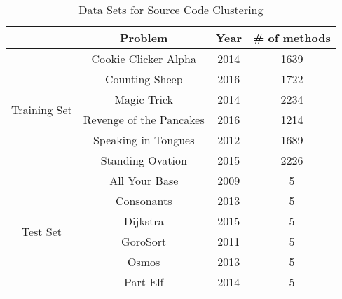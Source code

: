 \renewcommand{\multirowsetup}{\centering}
\begin{table}[th]
\caption{Data Sets for Source Code Clustering}
\label{table:method_data}
\center
\scriptsize{
\begin{tabular}{|c|c|c|c|}
 \hline
  & Problem & Year &\# of methods  \\
 \hline \hline
 \multirow{6}{1.5cm}{Training Set} & Cookie Clicker Alpha & 2014 &%
 1639\\
 \cline{2-4}
  & Counting Sheep & 2016 &%
  1722\\
 \cline{2-4}
  & Magic Trick & 2014 &%
  2234\\
 \cline{2-4}
 & Revenge of the Pancakes & 2016 &%
 1214\\
 \cline{2-4}
 & Speaking in Tongues & 2012 &%
 1689\\
 \cline{2-4}
 & Standing Ovation & 2015 &%
 2226\\
 \hline
 \multirow{6}{1.5cm}{Test Set} & All Your Base & 2009 & 5 \\ %
 \cline{2-4}
 & Consonants & 2013 & 5 \\ %
 \cline{2-4}
 & Dijkstra & 2015 & 5 \\ %
 \cline{2-4}
 & GoroSort & 2011 & 5 \\%
 \cline{2-4}
 & Osmos & 2013 & 5 \\ %
 \cline{2-4}
 & Part Elf & 2014 & 5 \\ %
 \hline
\end{tabular}
}
\end{table}

%


